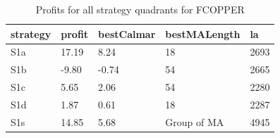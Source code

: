 \documentclass{tewiart}
\begin{document}
\newpage
\begin{table}[!t]
\caption{Profits for all strategy quadrants for FCOPPER}
 \begin{center}
 \begin{tabular}{|l|l|l|l|l|}
 \hline \textbf{strategy} & \textbf{profit} & \textbf{bestCalmar} & \textbf{bestMALength} & \textbf{la} \\ \hline
S1a & 17.19 & 8.24 & 18 & 2693\\ \hline
S1b & -9.80 & -0.74 & 54 & 2665\\ \hline
S1c & 5.65 & 2.06 & 54 & 2280\\ \hline
S1d & 1.87 & 0.61 & 18 & 2287\\ \hline
S1s & 14.85 & 5.68 & Group of MA & 4945\\
\hline \end{tabular}
 \end{center}
 \end{table}
\FloatBarrier
\end{document}
